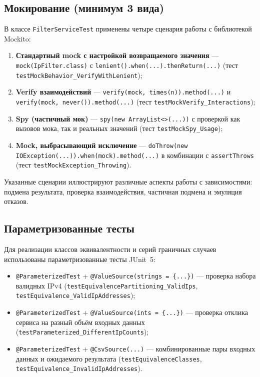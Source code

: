 \subsection{Мокирование (минимум 3 вида)}
В классе \texttt{FilterServiceTest} применены четыре сценария работы с библиотекой Mockito:
\begin{enumerate}
    \item \textbf{Стандартный mock с настройкой возвращаемого значения} --- \texttt{mock(IpFilter.class)} с \texttt{lenient().when(...).thenReturn(...)} (тест \texttt{testMockBehavior\_VerifyWithLenient});
    \item \textbf{Verify взаимодействий} --- \texttt{verify(mock, times(n)).method(...)} и \texttt{verify(mock, never()).method(...)} (тест \texttt{testMockVerify\_Interactions});
    \item \textbf{Spy (частичный мок)} --- \texttt{spy(new ArrayList<>(...))} с проверкой как вызовов мока, так и реальных значений (тест \texttt{testMockSpy\_Usage});
    \item \textbf{Mock, выбрасывающий исключение} --- \texttt{doThrow(new IOException(...)).when(mock).method(...)} в комбинации с \texttt{assertThrows} (тест \texttt{testMockException\_Throwing}).
\end{enumerate}
Указанные сценарии иллюстрируют различные аспекты работы с зависимостями: подмена результата, проверка взаимодействия, частичная подмена и эмуляция отказов.

\subsection{Параметризованные тесты}
Для реализации классов эквивалентности и серий граничных случаев использованы параметризованные тесты JUnit~5:
\begin{itemize}
    \item \texttt{@ParameterizedTest} + \texttt{@ValueSource(strings = \{...\})} --- проверка набора валидных IPv4 (\texttt{testEquivalence\-Partitioning\_Valid\-Ips}, \texttt{testEquivalence\_Valid\-IpAddresses});
    \item \texttt{@ParameterizedTest} + \texttt{@ValueSource(ints = \{...\})} --- проверка отклика сервиса на разный объём входных данных (\texttt{testParameterized\_DifferentIp\-Counts});
    \item \texttt{@ParameterizedTest} + \texttt{@CsvSource(...)} --- комбинированные пары входных данных и ожидаемого результата (\texttt{testEquivalence\-Classes}, \texttt{testEquivalence\_Invalid\-IpAddresses}).
\end{itemize}

